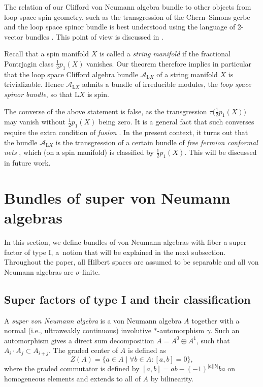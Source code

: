 \documentclass[10pt,a4paper]{amsart}
\numberwithin{equation}{section}
\renewcommand{\L}{\mathrm{L}}
\begin{document}
The relation of our Clifford von Neumann algebra bundle to other objects from loop space spin geometry, such as the transgression of the Chern--Simons gerbe \cite{WaldorfSpinString} and the loop space spinor bundle \cite{ KristelWaldorf2, KristelWaldorf3,KristelWaldorf1} is best understood using the language of 2-vector bundles \cite{2vectorbundles}.
This point of view is discussed in \cite[Section~1]{LudewigSpinorBundle}.

Recall that a spin manifold $X$ is called a \emph{string manifold} if the fractional Pontrjagin class $\frac{1}{2}p_1(X)$ vanishes.
Our theorem therefore implies in particular that the loop space Clifford algebra bundle $\mathcal{A}_{\L X}$ of a string manifold $X$ is trivializable.
Hence $\mathcal{A}_{\L X}$ admits a bundle of irreducible modules, the \emph{loop space spinor bundle}, so that $\L X$ is spin.

The converse of the above statement is false, as the transgression $\tau\big(\frac{1}{2}p_1(X)\big)$ may vanish without $\frac{1}{2}p_1(X)$ being zero.
It is a general fact that such converses require the extra condition of \emph{fusion} \cite{WaldorfTransgressionI, WaldorfTransgressionII, WaldorfTransgressionIII}.
In the present context, it turns out that the bundle $\mathcal{A}_{\L X}$ is the transgression of a certain bundle of \emph{free fermion conformal nets} \cite{DouglasHenriquesModularFormsConformalNets}, which (on a spin manifold) is classified by $\frac{1}{2}p_1(X)$.
This will be discussed in future work.



\section{Bundles of super von Neumann algebras}

In this section, we define bundles of von Neumann algebras with fiber a super factor of type I, a~notion that will be explained in the next subsection.
Throughout the paper, all Hilbert spaces are assumed to be separable and all von Neumann algebras are $\sigma$-finite.

\subsection{Super factors of type I and their classification} \label{SectionSuperFactors}

A \emph{super von Neumann algebra} is a von Neumann algebra $A$ together with a normal (i.e., ultraweakly continuous) involutive $*$-automorphism $\gamma$.
Such an automorphism gives a direct sum decomposition $A = A^0 \oplus A^1$, such that $A_i \cdot A_j \subset A_{i+j}$.
The graded center of $A$ is defined as
\begin{equation*}
Z(A) = \{a \in A \mid \forall b \in A\colon  [a, b] = 0 \},
\end{equation*}
where the graded commutator is defined by $[a, b] = ab - (-1)^{|a||b|} ba$ on homogeneous elements and extends to all of $A$ by bilinearity.
\end{document}
